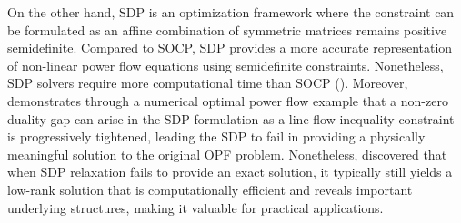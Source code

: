 On the other hand, \gls{SDP} is an optimization framework where the constraint can be formulated as an affine combination of symmetric matrices remains positive semidefinite. Compared to \gls{SOCP}, \gls{SDP} provides a more accurate representation of non-linear power flow equations using semidefinite constraints. Nonetheless, \gls{SDP} solvers require more computational time than \gls{SOCP} (\cite{lavaei2011zero}). Moreover, \cite{lesieutre2011examining} demonstrates through a numerical optimal power flow example that a non-zero duality gap can arise in the \gls{SDP} formulation as a line-flow inequality constraint is progressively tightened, leading the SDP to fail in providing a physically meaningful solution to the original \gls{OPF} problem. Nonetheless, \cite{madani2014convex} discovered that when \gls{SDP} relaxation fails to provide an exact solution, it typically still yields a low-rank solution that is computationally efficient and reveals important underlying structures, making it valuable for practical applications.



